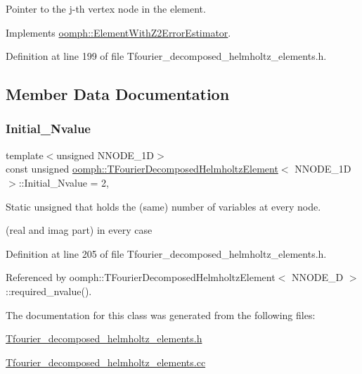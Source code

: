 Pointer to the j-\/th vertex node in the element. 



Implements \hyperlink{classoomph_1_1ElementWithZ2ErrorEstimator_a0eedccc33519f852c5dc2055ddf2774b}{oomph\+::\+Element\+With\+Z2\+Error\+Estimator}.



Definition at line 199 of file Tfourier\+\_\+decomposed\+\_\+helmholtz\+\_\+elements.\+h.



\subsection{Member Data Documentation}
\mbox{\label{classoomph_1_1TFourierDecomposedHelmholtzElement_a9f9d977a7d4ae085a34f9a96c2572dd5}} 
\subsubsection{\texorpdfstring{Initial\+\_\+\+Nvalue}{Initial\_Nvalue}}
{\footnotesize\ttfamily template$<$unsigned N\+N\+O\+D\+E\+\_\+1D$>$ \\
const unsigned \hyperlink{classoomph_1_1TFourierDecomposedHelmholtzElement}{oomph\+::\+T\+Fourier\+Decomposed\+Helmholtz\+Element}$<$ N\+N\+O\+D\+E\+\_\+1D $>$\+::Initial\+\_\+\+Nvalue = 2\hspace{0.3cm}{\ttfamily [static]}, {\ttfamily [private]}}



Static unsigned that holds the (same) number of variables at every node. 

(real and imag part) in every case 

Definition at line 205 of file Tfourier\+\_\+decomposed\+\_\+helmholtz\+\_\+elements.\+h.



Referenced by oomph\+::\+T\+Fourier\+Decomposed\+Helmholtz\+Element$<$ N\+N\+O\+D\+E\+\_\+D $>$\+::required\+\_\+nvalue().



The documentation for this class was generated from the following files\+:\begin{DoxyCompactItemize}
\item 
\hyperlink{Tfourier__decomposed__helmholtz__elements_8h}{Tfourier\+\_\+decomposed\+\_\+helmholtz\+\_\+elements.\+h}\item 
\hyperlink{Tfourier__decomposed__helmholtz__elements_8cc}{Tfourier\+\_\+decomposed\+\_\+helmholtz\+\_\+elements.\+cc}\end{DoxyCompactItemize}
